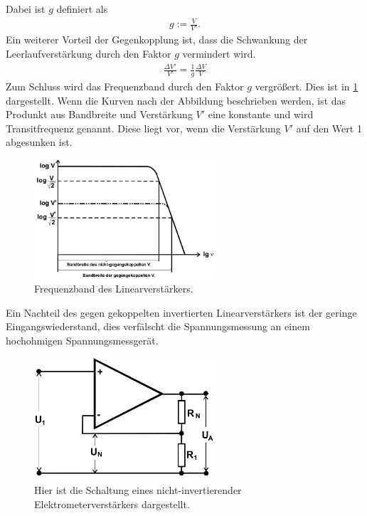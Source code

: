 Dabei ist $g$ definiert als
\begin{align}
	g:= \frac{V}{V'}.
\end{align}
Ein weiterer Vorteil der Gegenkopplung ist, dass die Schwankung der Leerlaufverstärkung durch den Faktor $g$ vermindert wird.
\begin{align}
	\frac{\Delta V'}{V'}=\frac{1}{g}\frac{\Delta V}{V}
\end{align}
Zum Schluss wird das Frequenzband durch den Faktor $g$ vergrößert.
Dies ist in \cref{fig:Frequenzgang} dargestellt. Wenn die Kurven nach der Abbildung beschrieben werden, ist das Produnkt aus Bandbreite und Verstärkung $V'$ eine  konstante und wird Transitfrequenz genannt.
Diese liegt vor, wenn die Verstärkung $V'$ auf den Wert 1 abgesunken ist.
\begin{figure}
	\centering
	\includegraphics[width = 0.6\textwidth]{../Grafiken/Frequenz_Liniearverstaerker.png}
	\caption{Frequenzband des Linearverstärkers. \cite{V51}\label{fig:Frequenzgang}}
\end{figure}
Ein Nachteil des gegen gekoppelten invertierten Linearverstärkers ist der geringe Eingangswiederstand, dies verfälscht die Spannungsmessung an einem hochohmigen Spannungsmessgerät.
\begin{figure}[h!]
	\centering
	\includegraphics[width = 0.6\textwidth]{../Grafiken/nicht_invertierter_Linearverstaerker.png}
	\caption{Hier ist die Schaltung eines nicht-invertierender Elektrometerverstärkers dargestellt. \cite{V51}\label{fig:Elektrometerverstärker}}
\end{figure}
